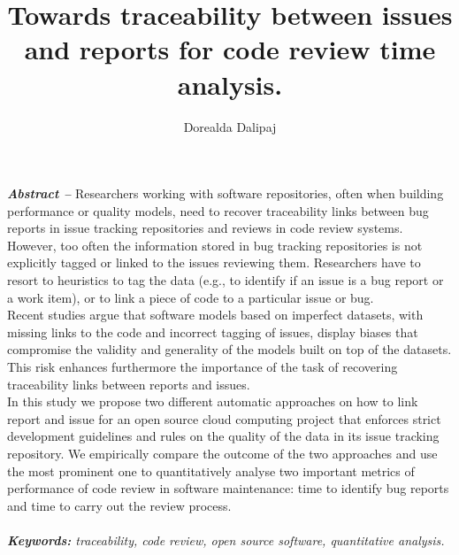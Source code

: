 \documentclass[ifip]{svmult}
\begin{document}
\title*{Towards traceability between issues and reports for code review time analysis.}
\author{Dorealda Dalipaj}
%
%
\maketitle

\textbf{\textit{Abstract --}} Researchers working with software repositories, 
often when building performance or quality models, need to recover traceability links between bug reports 
in issue tracking repositories and reviews in code review systems. 
\\
However, too often the information stored in bug tracking repositories is not
explicitly tagged or linked to the issues reviewing them. Researchers have to
resort to heuristics to tag the data (e.g., to identify if an issue is a bug report or a work item), 
or to link a piece of code to a particular issue or bug.
\\
Recent studies argue that software models based on imperfect datasets, with missing
links to the code and incorrect tagging of issues, display biases
that compromise the validity and generality of the models built on top of the datasets. 
This risk enhances furthermore the importance of the task of recovering 
traceability links between reports and issues. 
\\
In this study we propose two different automatic approaches on how to link report and issue 
for an open source cloud computing project that enforces 
strict development guidelines and rules on the quality of the 
data in its issue tracking repository. We empirically compare the outcome of the two 
approaches and use the most prominent one to quantitatively analyse two important metrics of performance 
of code review in software maintenance: time to identify bug reports and time to carry out the review process.
\\
\\
\textit{\textbf{Keywords:} traceability, code review, open source software, quantitative analysis.}
\end{document}
